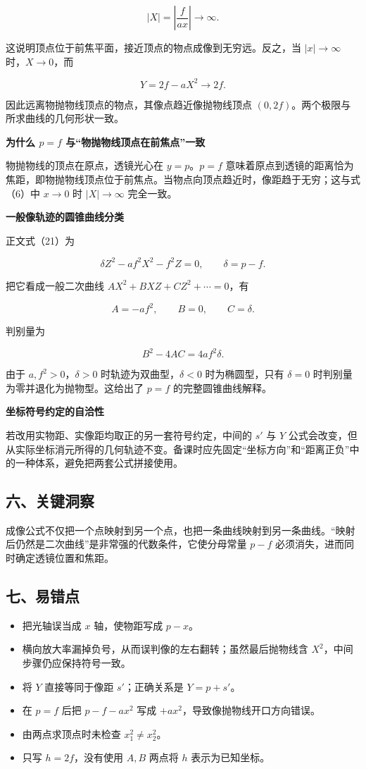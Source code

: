 \documentclass[12pt,a4paper,UTF8]{ctexart}
\newcommand{\tightlist}{\setlength{\itemsep}{0pt}\setlength{\parskip}{0pt}}
\begin{document}
\[
|X|=\left|\frac{f}{ax}\right|\to\infty.
\]

这说明顶点位于前焦平面，接近顶点的物点成像到无穷远。反之，当
\(|x|\to\infty\) 时，\(X\to0\)，而

\[
Y=2f-aX^2\to2f.
\]

因此远离物抛物线顶点的物点，其像点趋近像抛物线顶点
\((0,2f)\)。两个极限与所求曲线的几何形状一致。

\textbf{为什么 \(p=f\) 与``物抛物线顶点在前焦点''一致}

物抛物线的顶点在原点，透镜光心在 \(y=p\)。\(p=f\)
意味着原点到透镜的距离恰为焦距，即物抛物线顶点位于前焦点。当物点向顶点趋近时，像距趋于无穷；这与式（6）中
\(x\to0\) 时 \(|X|\to\infty\) 完全一致。

\textbf{一般像轨迹的圆锥曲线分类}

正文式（21）为

\[
\delta Z^2-af^2X^2-f^2Z=0,
\qquad \delta=p-f.
\]

把它看成一般二次曲线 \(AX^2+B XZ+CZ^2+\cdots=0\)，有

\[
A=-af^2,
\qquad B=0,
\qquad C=\delta.
\]

判别量为

\[
B^2-4AC=4af^2\delta.
\]

由于 \(a,f^2>0\)，\(\delta>0\) 时轨迹为双曲型，\(\delta<0\)
时为椭圆型，只有 \(\delta=0\) 时判别量为零并退化为抛物型。这给出了
\(p=f\) 的完整圆锥曲线解释。

\textbf{坐标符号约定的自洽性}

若改用实物距、实像距均取正的另一套符号约定，中间的 \(s'\) 与 \(Y\)
公式会改变，但从实际坐标消元所得的几何轨迹不变。备课时应先固定``坐标方向''和``距离正负''中的一种体系，避免把两套公式拼接使用。

\subsection{六、关键洞察}\label{ux516dux5173ux952eux6d1eux5bdf-5}

成像公式不仅把一个点映射到另一个点，也把一条曲线映射到另一条曲线。``映射后仍然是二次曲线''是非常强的代数条件，它使分母常量
\(p-f\) 必须消失，进而同时确定透镜位置和焦距。

\subsection{七、易错点}\label{ux4e03ux6613ux9519ux70b9-5}

\begin{itemize}
\tightlist
\item
  把光轴误当成 \(x\) 轴，使物距写成 \(p-x\)。
\item
  横向放大率漏掉负号，从而误判像的左右翻转；虽然最后抛物线含
  \(X^2\)，中间步骤仍应保持符号一致。
\item
  将 \(Y\) 直接等同于像距 \(s'\)；正确关系是 \(Y=p+s'\)。
\item
  在 \(p=f\) 后把 \(p-f-ax^2\) 写成
  \(+ax^2\)，导致像抛物线开口方向错误。
\item
  由两点求顶点时未检查 \(x_1^2\ne x_2^2\)。
\item
  只写 \(h=2f\)，没有使用 \(A,B\) 两点将 \(h\) 表示为已知坐标。
\end{itemize}
\end{document}
